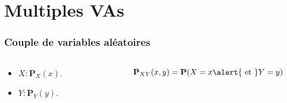 \documentclass{beamer}
\renewcommand{\P}{\mathbf{P}}
\begin{document}
\section{Multiples VAs}
\begin{frame}[t]
  \frametitle{Couple de variables aléatoires}
  
  \begin{columns}
    \begin{column}{0.4\textwidth}
     {
         \begin{itemize}
           \item $ X : \P_X(x)$.\\[4pt]
           \item $ Y : \P_Y(y)$.\\[4pt]
         \end{itemize}        
     }
     \only<2->{
       \begin{tcolorbox}[title=Question]
         \small
         $\P(X = Y)$?
       \end{tcolorbox}
       
     }
    \end{column}
    \begin{column}{0.6\textwidth}
      
      {
        \begin{tcolorbox}[title=Loi de couple de VA]
          \small
          $$
          \P_{XY}(x, y) = \P(X=x \alert{\text{ et }} Y = y)
          $$
          

\end{tcolorbox}}
\end{column}
\end{columns}
\end{frame}
\end{document}
